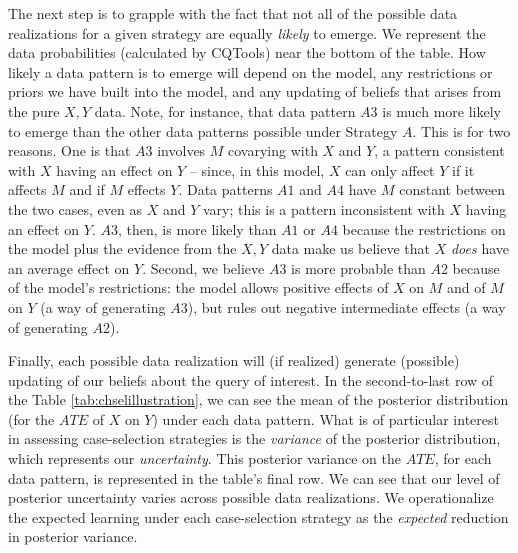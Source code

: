 \documentclass[
  12pt,
]{book}
\begin{document}
The next step is to grapple with the fact that not all of the possible data realizations for a given strategy are equally \emph{likely} to emerge. We represent the data probabilities (calculated by CQTools) near the bottom of the table. How likely a data pattern is to emerge will depend on the model, any restrictions or priors we have built into the model, and any updating of beliefs that arises from the pure \(X,Y\) data. Note, for instance, that data pattern \(A3\) is much more likely to emerge than the other data patterns possible under Strategy \(A\). This is for two reasons. One is that \(A3\) involves \(M\) covarying with \(X\) and \(Y\), a pattern consistent with \(X\) having an effect on \(Y\) -- since, in this model, \(X\) can only affect \(Y\) if it affects \(M\) and if \(M\) effects \(Y\). Data patterns \(A1\) and \(A4\) have \(M\) constant between the two cases, even as \(X\) and \(Y\) vary; this is a pattern inconsistent with \(X\) having an effect on \(Y\). \(A3\), then, is more likely than \(A1\) or \(A4\) because the restrictions on the model plus the evidence from the \(X,Y\) data make us believe that \(X\) \emph{does} have an average effect on \(Y\). Second, we believe \(A3\) is more probable than \(A2\) because of the model's restrictions: the model allows positive effects of \(X\) on \(M\) and of \(M\) on \(Y\) (a way of generating \(A3\)), but rules out negative intermediate effects (a way of generating \(A2\)).

Finally, each possible data realization will (if realized) generate (possible) updating of our beliefs about the query of interest. In the second-to-last row of the Table \ref{tab:chselillustration}, we can see the mean of the posterior distribution (for the \(ATE\) of \(X\) on \(Y\)) under each data pattern. What is of particular interest in assessing case-selection strategies is the \emph{variance} of the posterior distribution, which represents our \emph{uncertainty}. This posterior variance on the \(ATE\), for each data pattern, is represented in the table's final row. We can see that our level of posterior uncertainty varies across possible data realizations. We operationalize the expected learning under each case-selection strategy as the \emph{expected} reduction in posterior variance.
\end{document}
